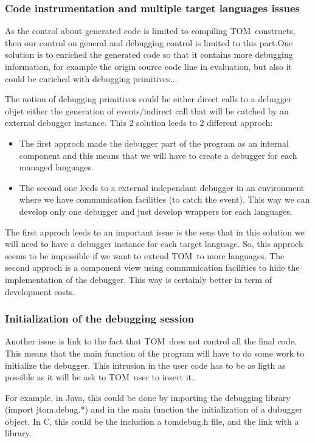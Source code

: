 \documentclass[a4paper]{article}
\newcommand{\TOM}{\textsf{TOM}}
\newcommand{\C}{\textsf{C}}
\newcommand{\Java}{\textsf{Java}}
\begin{document}
\subsubsection{Code instrumentation and multiple
  target languages issues}

As the control about generated code is limited to compiling \TOM\
constructs, then our control on general and debugging control is
limited to this part.One solution is to enriched the generated code so
that it contains more debugging information, for example the origin
source code line in evaluation, but also it could be enriched with debugging
primitives... 

The notion of debugging primitives could be either direct calls to a
debugger objet either the generation of events/indirect call that will
be catched by an external debugger instance. This 2 solution leeds to 2 different approch:
\begin{itemize}
\item The first approch made the debugger part of the program as an
  internal component and this means that we will have to create a
  debugger for each managed languages.
\item The second one leeds to a external independant debugger
  in an environment where we have communication facilities (to catch
  the event). This way we can develop only one debugger and just
  develop wrappers for each languages. 
\end{itemize}
The first approch leeds to an important issue is the sens that in this
solution we will need to have a debugger instance for each target
language. So, this approch seems to be impossible if we want to extend
\TOM\ to more languages. The second approch is a component view using
communication facilities to hide the implementation of the
debugger. This way is certainly better in term of development costs.

\subsubsection{Initialization of the debugging session}

Another issue is link to the fact that \TOM\ does not control
all the final code. This means that the main function
of the program will have to do some work to initialize the
debugger. This intrusion in the user code has to be as ligth as
possible as it will be ask to \TOM\ user to insert it..

For example. in \Java, this could be done by importing the debugging
library (import jtom.debug.*) and in the main function the initialization of a dubugger
object.
In \C, this could be the includion a tomdebug.h file, and the link with a library.
 
\end{document}
